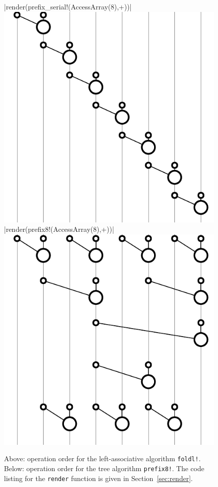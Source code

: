 \documentclass{sig-alternate}
\newcommand{\code}[1]{\texttt{#1}}
\begin{document}
\begin{figure}
  \centering

  |render(prefix_serial!(AccessArray(8),+))|
  \includegraphics{serial}
  \vspace{12 pt}
  |render(prefix8!(AccessArray(8),+))|
  \includegraphics{tree}
  \caption{Above: operation order for the left-associative algorithm \code{foldl!}.
           Below: operation order for the tree algorithm \code{prefix8!}.
           The code listing for the \code{render} function is given in Section~\ref{sec:render}.}
  \label{fig:gates}
\end{figure}
\end{document}
